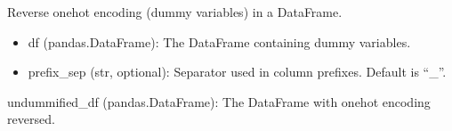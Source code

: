 \documentclass[letterpaper,10pt,english]{sphinxmanual}
\begin{document}
\begin{fulllineitems}
\label{\detokenize{utils:utils.undummify}}
\pysigstartsignatures
{}
\pysigstopsignatures
\sphinxAtStartPar
Reverse one\sphinxhyphen{}hot encoding (dummy variables) in a DataFrame.
\begin{description}
\begin{itemize}
\item {} 
\sphinxAtStartPar
df (pandas.DataFrame): The DataFrame containing dummy variables.

\item {} 
\sphinxAtStartPar
prefix\_sep (str, optional): Separator used in column prefixes. Default is “\_”.

\end{itemize}

\sphinxAtStartPar
undummified\_df (pandas.DataFrame): The DataFrame with one\sphinxhyphen{}hot encoding reversed.

\end{description}

\end{fulllineitems}

\end{document}
